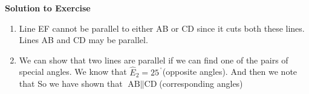 \begin{table}[H]
{\begin{mdframed}[linewidth=4, leftmargin=40, rightmargin=40]
\begin{exercise}
\label{m38380*eip-668}\noindent\textbf{Solution to Exercise }
  \label{m38380*eip-82}\begin{enumerate}[noitemsep, label=\textbf{Step}
\textbf{\arabic*}. ] 
            \leftskip=20pt\rightskip=\leftskip\item Line EF cannot be parallel
to either AB or CD since it cuts both these lines. Lines AB and CD may be
parallel.\item We can show that two lines are parallel if we can find one of the
pairs of special angles. We know that 
\begin{math}{\hat{E}}_{2}={25}^{\ensuremath{{\,}^{\circ}}}\end{math}(opposite
angles). And then we note that 
\label{m38380*eid6634}\nopagebreak\noindent{}
     So we have shown that 
\begin{math}\text{AB}\parallel \text{CD}\end{math}\hspace{1ex}(corresponding
angles)\end{enumerate}
        



\end{exercise}
\end{mdframed}}
\end{table}

